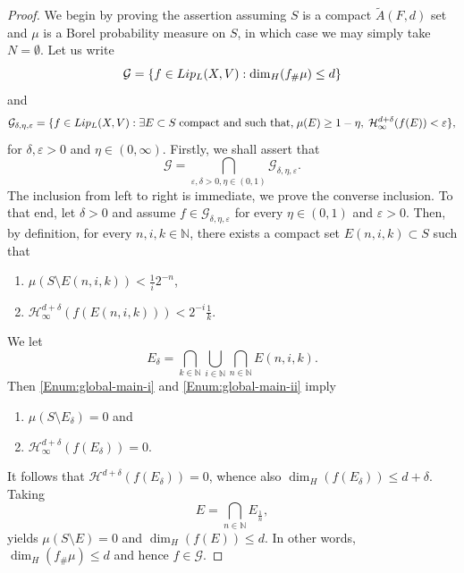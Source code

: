 \documentclass[10pt,a4paper]{amsart}
\def\H{\mathcal{H}}
\def\nat{\mathbb{N}}
\newcommand{\tLip}{\textnormal{Lip}}
\begin{document}
\begin{proof}
    We begin by proving the assertion assuming $S$ is a 
    compact $\tilde{A}(F,d)$ set and $\mu$ is a Borel probability measure on $S$, in which case we may simply take $N=\emptyset$. Let us write
    \begin{equation*}
        \mathcal{G}=\{f\in \tLip_L(X,V): \dim_H(f_\# \mu)\leq d\}
    \end{equation*}
    and
    \begin{equation*}
        \mathcal{G}_{\delta, \eta, \varepsilon}=\{f\in \tLip_L(X,V): \exists E \subset S\;\text{compact and such that,}\; \mu(E)\geq 1-\eta,\; \H^{d+\delta}_\infty(f(E)) < \varepsilon\},
    \end{equation*}
    for $\delta, \varepsilon>0$ and $\eta \in (0,\infty)$.
    Firstly, we shall assert that
    \begin{equation*}
        \mathcal{G}=\bigcap_{\varepsilon, \delta>0, \eta\in (0,1)} \mathcal{G}_{\delta, \eta, \varepsilon}.
    \end{equation*}
    The inclusion from left to right is immediate, we prove the converse inclusion. To that end, let $\delta>0$ and assume $f\in \mathcal{G}_{\delta, \eta, \varepsilon}$ for every $\eta\in (0,1)$ and $\varepsilon>0$. Then, by definition, for every $n,i,k\in \nat$, there exists a compact set $E(n,i,k)\subset S$ such that
    \begin{enumerate}
        \item\label{Enum:global-main-i} $\mu(S\setminus E(n,i,k))< \frac{1}{i}2^{-n}$,
        \item\label{Enum:global-main-ii} $\H^{d+\delta}_\infty(f(E(n,i,k)))< 2^{-i} \frac{1}{k}$.
    \end{enumerate}
    We let
    \begin{equation*}
        E_\delta=\bigcap_{k\in\nat} \bigcup_{i\in\nat} \bigcap_{n\in \nat} E(n,i,k).
    \end{equation*}
    Then \ref{Enum:global-main-i} and \ref{Enum:global-main-ii} imply 
    \begin{enumerate}[label={\rm(\alph*)}]
        \item $\mu(S\setminus E_\delta)=0$ and
        \item $\H^{d+\delta}_\infty(f(E_\delta))=0$.
    \end{enumerate}

    It follows that $\H^{d+\delta}(f(E_\delta))=0$, whence also $\dim_H(f(E_\delta))\leq d+\delta$. Taking
    \begin{equation*}
        E=\bigcap_{n\in \nat} E_{\frac{1}{n}},
    \end{equation*}
    yields $\mu(S\setminus E)=0$ and $\dim_H(f(E))\leq d$. In other words, $\dim_H(f_\# \mu)\leq d$ and hence $f\in \mathcal{G}$.


\end{proof}
\end{document}

